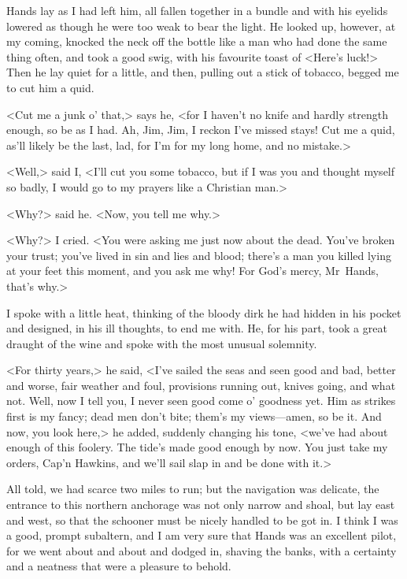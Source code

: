 Hands lay as I had left him, all fallen together in a bundle and with his eyelids lowered as though he were too weak to bear the light. He looked up, however, at my coming, knocked the neck off the bottle like a man who had done the same thing often, and took a good swig, with his favourite toast of <Here's luck!> Then he lay quiet for a little, and then, pulling out a stick of tobacco, begged me to cut him a quid.

<Cut me a junk o' that,> says he, <for I haven't no knife and hardly strength enough, so be as I had. Ah, Jim, Jim, I reckon I've missed stays! Cut me a quid, as'll likely be the last, lad, for I'm for my long home, and no mistake.>

<Well,> said I, <I'll cut you some tobacco, but if I was you and thought myself so badly, I would go to my prayers like a Christian man.>

<Why?> said he. <Now, you tell me why.>

<Why?> I cried. <You were asking me just now about the dead. You've broken your trust; you've lived in sin and lies and blood; there's a man you killed lying at your feet this moment, and you ask me why! For God's mercy, Mr~Hands, that's why.>

I spoke with a little heat, thinking of the bloody dirk he had hidden in his pocket and designed, in his ill thoughts, to end me with. He, for his part, took a great draught of the wine and spoke with the most unusual solemnity.

<For thirty years,> he said, <I've sailed the seas and seen good and bad, better and worse, fair weather and foul, provisions running out, knives going, and what not. Well, now I tell you, I never seen good come o' goodness yet. Him as strikes first is my fancy; dead men don't bite; them's my views—amen, so be it. And now, you look here,> he added, suddenly changing his tone, <we've had about enough of this foolery. The tide's made good enough by now. You just take my orders, Cap'n Hawkins, and we'll sail slap in and be done with it.>

All told, we had scarce two miles to run; but the navigation was delicate, the entrance to this northern anchorage was not only narrow and shoal, but lay east and west, so that the schooner must be nicely handled to be got in. I think I was a good, prompt subaltern, and I am very sure that Hands was an excellent pilot, for we went about and about and dodged in, shaving the banks, with a certainty and a neatness that were a pleasure to behold.

